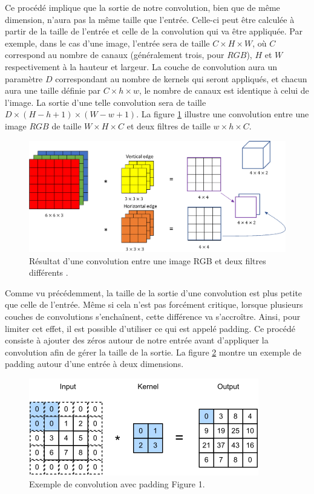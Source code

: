 Ce procédé implique que la sortie de notre convolution, bien que de même dimension, n'aura pas la même taille que l'entrée. Celle-ci peut être calculée à partir de la taille de l'entrée et celle de la convolution qui va être appliquée. Par exemple, dans le cas d'une image, l'entrée sera de taille $C \times H \times W$, où $C$ correspond au nombre de canaux (généralement trois, pour $RGB$), $H$ et $W$ respectivement à la hauteur et largeur. La couche de convolution aura un paramètre $D$ correspondant au nombre de kernels qui seront appliqués, et chacun aura une taille définie par $C \times h \times w$, le nombre de canaux est identique à celui de l'image. La sortie d'une telle convolution sera de taille $D \times (H - h + 1) \times (W - w + 1)$. La figure \ref{fig:image_convolution_example} illustre une convolution entre une image $RGB$ de taille $W \times H \times C$ et deux filtres de taille $w \times h \times C$.

\begin{figure}[hbt!]
    \centering
    \includegraphics[scale=0.38]{Figures/image_convolution_example.png}
    \caption{Résultat d'une convolution entre une image RGB et deux filtres différents \cite{noauthor_06_09png_nodate}.}
    \label{fig:image_convolution_example}
\end{figure}

Comme vu précédemment, la taille de la sortie d'une convolution est plus petite que celle de l'entrée. Même si cela n'est pas forcément critique, lorsque plusieurs couches de convolutions s'enchaînent, cette différence va s'accroître. Ainsi, pour limiter cet effet, il est possible d'utiliser ce qui est appelé padding. Ce procédé consiste à ajouter des zéros autour de notre entrée avant d'appliquer la convolution afin de gérer la taille de la sortie. La figure \ref{fig:convolution_padding_example} montre un exemple de padding autour d'une entrée à deux dimensions.

\begin{figure}[hbt!]
    \centering
    \includegraphics[scale=0.6]{Figures/convolution_padding_example.png}
    \caption{Exemple de convolution avec padding \cite{mohammed_spatiotemporal_2024} Figure 1.}
    \label{fig:convolution_padding_example}
\end{figure}

